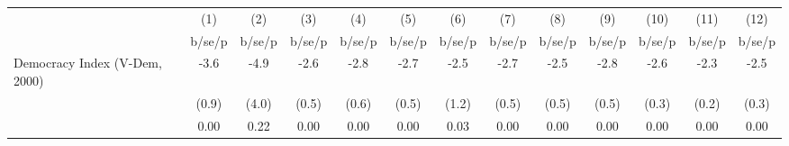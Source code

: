 \begin{tabular}{l*{12}{c}}
\hline\hline
                    &\multicolumn{1}{c}{(1)}&\multicolumn{1}{c}{(2)}&\multicolumn{1}{c}{(3)}&\multicolumn{1}{c}{(4)}&\multicolumn{1}{c}{(5)}&\multicolumn{1}{c}{(6)}&\multicolumn{1}{c}{(7)}&\multicolumn{1}{c}{(8)}&\multicolumn{1}{c}{(9)}&\multicolumn{1}{c}{(10)}&\multicolumn{1}{c}{(11)}&\multicolumn{1}{c}{(12)}\\
                    &      b/se/p&      b/se/p&      b/se/p&      b/se/p&      b/se/p&      b/se/p&      b/se/p&      b/se/p&      b/se/p&      b/se/p&      b/se/p&      b/se/p\\
\hline
Democracy Index (V-Dem, 2000)&        -3.6&        -4.9&        -2.6&        -2.8&        -2.7&        -2.5&        -2.7&        -2.5&        -2.8&        -2.6&        -2.3&        -2.5\\
                    &       (0.9)&       (4.0)&       (0.5)&       (0.6)&       (0.5)&       (1.2)&       (0.5)&       (0.5)&       (0.5)&       (0.3)&       (0.2)&       (0.3)\\
                    &        0.00&        0.22&        0.00&        0.00&        0.00&        0.03&        0.00&        0.00&        0.00&        0.00&        0.00&        0.00\\
\hline\hline
\end{tabular}
